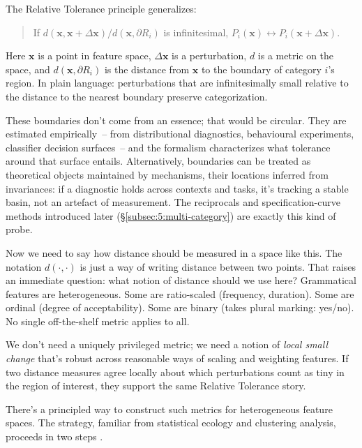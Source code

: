 The Relative Tolerance principle generalizes:

\begin{quote}
If $d(\mathbf{x}, \mathbf{x} + \Delta\mathbf{x}) / d(\mathbf{x}, \partial R_i)$ is infinitesimal, $P_i(\mathbf{x}) \leftrightarrow P_i(\mathbf{x} + \Delta\mathbf{x})$.
\end{quote}

Here $\mathbf{x}$ is a point in feature space, $\Delta\mathbf{x}$ is a perturbation, $d$ is a metric on the space, and $d(\mathbf{x}, \partial R_i)$ is the distance from $\mathbf{x}$ to the boundary of category $i$'s region. In plain language: perturbations that are infinitesimally small relative to the distance to the nearest boundary preserve categorization.

These boundaries don't come from an essence; that would be circular. They are estimated empirically~-- from distributional diagnostics, behavioural experiments, classifier decision surfaces~-- and the formalism characterizes what tolerance around that surface entails. Alternatively, boundaries can be treated as theoretical objects maintained by mechanisms, their locations inferred from invariances: if a diagnostic holds across contexts and tasks, it's tracking a stable basin, not an artefact of measurement. The reciprocals and specification-curve methods introduced later (§\ref{subsec:5:multi-category}) are exactly this kind of probe.

Now we need to say how distance should be measured in a space like this. The notation $d(\cdot, \cdot)$ is just a way of writing distance between two points. That raises an immediate question: what notion of distance should we use here? Grammatical features are heterogeneous. Some are ratio-scaled (frequency, duration). Some are ordinal (degree of acceptability). Some are binary (takes plural marking: yes/no). No single off-the-shelf metric applies to all.

We don't need a uniquely privileged metric; we need a notion of \emph{local small change} that's robust across reasonable ways of scaling and weighting features. If two distance measures agree locally about which perturbations count as tiny in the region of interest, they support the same Relative Tolerance story.

There's a principled way to construct such metrics for heterogeneous feature spaces. The strategy, familiar from statistical ecology and clustering analysis, proceeds in two steps \citep[cf.][]{gower1971}.

